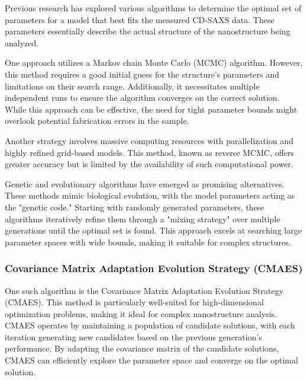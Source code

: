 \medskip

Previous research has explored various algorithms to determine the optimal set of parameters for a model that 
best fits the measured CD-SAXS data. These parameters essentially describe the actual structure of the nanostructure 
being analyzed.

\medskip

One approach utilizes a Markov chain Monte Carlo (MCMC) algorithm. However, this method requires a good initial 
guess for the structure's parameters and limitations on their search range. Additionally, it necessitates multiple 
independent runs to ensure the algorithm converges on the correct solution. While this approach can be effective, 
the need for tight parameter bounds might overlook potential fabrication errors in the sample.

\medskip

Another strategy involves massive computing resources with parallelization and highly refined grid-based models. 
This method, known as reverse MCMC, offers greater accuracy but is limited by the availability of such computational power.

\medskip

Genetic and evolutionary algorithms have emerged as promising alternatives. These methods mimic biological evolution, 
with the model parameters acting as the "genetic code." Starting with randomly generated parameters, these algorithms 
iteratively refine them through a "mixing strategy" over multiple generations until the optimal set is found. This 
approach excels at searching large parameter spaces with wide bounds, making it suitable for complex structures.
\cite{hannon2016advancing}
\subsubsection{Covariance Matrix Adaptation Evolution Strategy (CMAES)}

One such algorithm is the Covariance Matrix Adaptation Evolution Strategy (CMAES). This method is particularly 
well-suited for high-dimensional optimization problems, making it ideal for complex nanostructure analysis. CMAES 
operates by maintaining a population of candidate solutions, with each iteration generating new candidates based on 
the previous generation's performance. By adapting the covariance matrix of the candidate solutions, CMAES can efficiently 
explore the parameter space and converge on the optimal solution.

